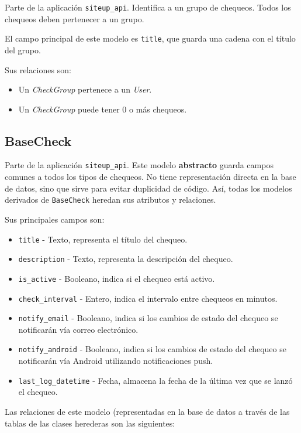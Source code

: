 Parte de la aplicación \texttt{siteup\_api}. Identifica a un grupo de
chequeos. Todos los chequeos deben pertenecer a un grupo. 

El campo principal de este modelo es \texttt{title}, que guarda una cadena con
el título del grupo.

Sus relaciones son:
\begin{itemize}
\item Un \textit{CheckGroup} pertenece a un \textit{User}.
\item Un \textit{CheckGroup} puede tener 0 o más chequeos.
\end{itemize}

\subsection{BaseCheck}

Parte de la aplicación \texttt{siteup\_api}. Este modelo \textbf{abstracto}
guarda campos comunes a todos los tipos de chequeos. No tiene representación
directa en la base de datos, sino que sirve para evitar duplicidad de
código. Así, todas los modelos derivados de \texttt{BaseCheck} heredan sus
atributos y relaciones.

Sus principales campos son:

\begin{itemize}
\item \texttt{title} - Texto, representa el título del chequeo.
\item \texttt{description} - Texto, representa la descripción del chequeo.
\item \texttt{is\_active} - Booleano, indica si el chequeo está activo.
\item \texttt{check\_interval} - Entero, indica el intervalo entre chequeos en minutos.
\item \texttt{notify\_email} - Booleano, indica si los cambios de estado del
  chequeo se notificarán vía correo electrónico.
\item \texttt{notify\_android} - Booleano, indica si los cambios de estado del
  chequeo se notificarán vía Android utilizando notificaciones push.
\item \texttt{last\_log\_datetime} - Fecha, almacena la fecha de la última vez que se lanzó el chequeo.
\end{itemize}

Las relaciones de este modelo (representadas en la base de datos a través de las
tablas de las clases herederas son las siguientes:

